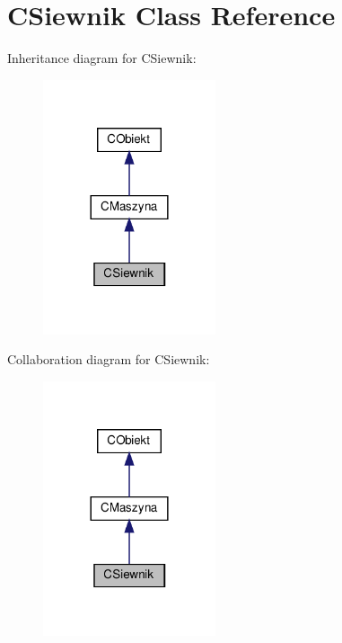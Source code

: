 \hypertarget{class_c_siewnik}{}\section{C\+Siewnik Class Reference}
\label{class_c_siewnik}


Inheritance diagram for C\+Siewnik\+:\nopagebreak
\begin{figure}[H]
\begin{center}
\leavevmode
\includegraphics[width=144pt]{class_c_siewnik__inherit__graph}
\end{center}
\end{figure}


Collaboration diagram for C\+Siewnik\+:\nopagebreak
\begin{figure}[H]
\begin{center}
\leavevmode
\includegraphics[width=144pt]{class_c_siewnik__coll__graph}
\end{center}
\end{figure}
